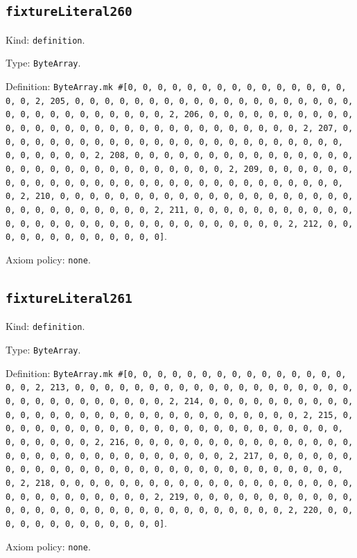 \documentclass[11pt]{article}
\begin{document}
\subsection*{\texttt{fixtureLiteral260}}
\noindent Kind: \texttt{definition}.\par
\noindent Type: \texttt{ByteArray}.\par
\noindent Definition: \texttt{ByteArray.mk \#[0, 0, 0, 0, 0, 0, 0, 0, 0, 0, 0, 0, 0, 0, 0, 0, 0, 2, 205, 0, 0, 0, 0, 0, 0, 0, 0, 0, 0, 0, 0, 0, 0, 0, 0, 0, 0, 0, 0, 0, 0, 0, 0, 0, 0, 0, 0, 0, 0, 2, 206, 0, 0, 0, 0, 0, 0, 0, 0, 0, 0, 0, 0, 0, 0, 0, 0, 0, 0, 0, 0, 0, 0, 0, 0, 0, 0, 0, 0, 0, 0, 2, 207, 0, 0, 0, 0, 0, 0, 0, 0, 0, 0, 0, 0, 0, 0, 0, 0, 0, 0, 0, 0, 0, 0, 0, 0, 0, 0, 0, 0, 0, 0, 2, 208, 0, 0, 0, 0, 0, 0, 0, 0, 0, 0, 0, 0, 0, 0, 0, 0, 0, 0, 0, 0, 0, 0, 0, 0, 0, 0, 0, 0, 0, 0, 2, 209, 0, 0, 0, 0, 0, 0, 0, 0, 0, 0, 0, 0, 0, 0, 0, 0, 0, 0, 0, 0, 0, 0, 0, 0, 0, 0, 0, 0, 0, 0, 2, 210, 0, 0, 0, 0, 0, 0, 0, 0, 0, 0, 0, 0, 0, 0, 0, 0, 0, 0, 0, 0, 0, 0, 0, 0, 0, 0, 0, 0, 0, 0, 2, 211, 0, 0, 0, 0, 0, 0, 0, 0, 0, 0, 0, 0, 0, 0, 0, 0, 0, 0, 0, 0, 0, 0, 0, 0, 0, 0, 0, 0, 0, 0, 2, 212, 0, 0, 0, 0, 0, 0, 0, 0, 0, 0, 0, 0, 0]}.\par
\noindent Axiom policy: \texttt{none}.\par
\subsection*{\texttt{fixtureLiteral261}}
\noindent Kind: \texttt{definition}.\par
\noindent Type: \texttt{ByteArray}.\par
\noindent Definition: \texttt{ByteArray.mk \#[0, 0, 0, 0, 0, 0, 0, 0, 0, 0, 0, 0, 0, 0, 0, 0, 0, 2, 213, 0, 0, 0, 0, 0, 0, 0, 0, 0, 0, 0, 0, 0, 0, 0, 0, 0, 0, 0, 0, 0, 0, 0, 0, 0, 0, 0, 0, 0, 0, 2, 214, 0, 0, 0, 0, 0, 0, 0, 0, 0, 0, 0, 0, 0, 0, 0, 0, 0, 0, 0, 0, 0, 0, 0, 0, 0, 0, 0, 0, 0, 0, 2, 215, 0, 0, 0, 0, 0, 0, 0, 0, 0, 0, 0, 0, 0, 0, 0, 0, 0, 0, 0, 0, 0, 0, 0, 0, 0, 0, 0, 0, 0, 0, 2, 216, 0, 0, 0, 0, 0, 0, 0, 0, 0, 0, 0, 0, 0, 0, 0, 0, 0, 0, 0, 0, 0, 0, 0, 0, 0, 0, 0, 0, 0, 0, 2, 217, 0, 0, 0, 0, 0, 0, 0, 0, 0, 0, 0, 0, 0, 0, 0, 0, 0, 0, 0, 0, 0, 0, 0, 0, 0, 0, 0, 0, 0, 0, 2, 218, 0, 0, 0, 0, 0, 0, 0, 0, 0, 0, 0, 0, 0, 0, 0, 0, 0, 0, 0, 0, 0, 0, 0, 0, 0, 0, 0, 0, 0, 0, 2, 219, 0, 0, 0, 0, 0, 0, 0, 0, 0, 0, 0, 0, 0, 0, 0, 0, 0, 0, 0, 0, 0, 0, 0, 0, 0, 0, 0, 0, 0, 0, 2, 220, 0, 0, 0, 0, 0, 0, 0, 0, 0, 0, 0, 0, 0]}.\par
\noindent Axiom policy: \texttt{none}.\par
\end{document}
